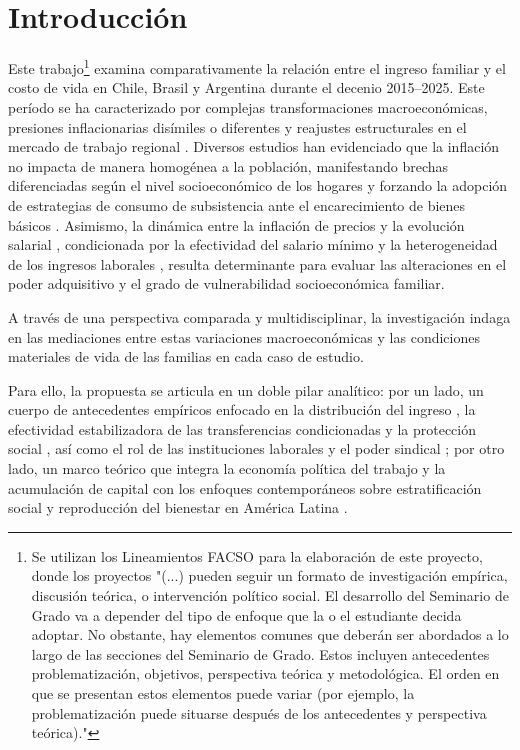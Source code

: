 \section{Introducción}

Este trabajo\footnote[1]{Se utilizan los Lineamientos FACSO para la elaboración de este proyecto, donde los proyectos "(...) pueden seguir un formato de investigación empírica, discusión teórica, o intervención político social. El desarrollo del Seminario de Grado va a depender del tipo de enfoque que la o el estudiante decida adoptar. No obstante, hay elementos comunes que deberán ser abordados a lo largo de las secciones del Seminario de Grado. Estos incluyen antecedentes problematización, objetivos, perspectiva teórica y metodológica. El orden en que se presentan estos elementos puede variar (por ejemplo, la problematización puede situarse después de los antecedentes y perspectiva teórica)."} examina comparativamente la relación entre el ingreso familiar y el costo de vida en Chile, Brasil y Argentina durante el decenio 2015–2025. Este período se ha caracterizado por complejas transformaciones macroeconómicas, presiones inflacionarias disímiles o diferentes y reajustes estructurales en el mercado de trabajo regional \parencite{cepalPanoramaSocialAmerica2025}. Diversos estudios han evidenciado que la inflación no impacta de manera homogénea a la población, manifestando brechas diferenciadas según el nivel socioeconómico de los hogares \parencite{Adam2025, doValleGomesdaSilva2026} y forzando la adopción de estrategias de consumo de subsistencia ante el encarecimiento de bienes básicos \parencite{Nessieretal2026}. Asimismo, la dinámica entre la inflación de precios y la evolución salarial \parencite{Malheretal2026}, condicionada por la efectividad del salario mínimo \parencite{GindlingRonconi2025, MaurizioVazquez2016} y la heterogeneidad de los ingresos laborales \parencite{DuranKremerman2024, INE2024}, resulta determinante para evaluar las alteraciones en el poder adquisitivo y el grado de vulnerabilidad socioeconómica familiar.

A través de una perspectiva comparada y multidisciplinar, la investigación indaga en las mediaciones entre estas variaciones macroeconómicas y las condiciones materiales de vida de las familias en cada caso de estudio. 

Para ello, la propuesta se articula en un doble pilar analítico: por un lado, un cuerpo de antecedentes empíricos enfocado en la distribución del ingreso \parencite{ResumenResultadosCASEN2023}, la efectividad estabilizadora de las transferencias condicionadas y la protección social \parencite{Stampinietal2025, Carrere2026}, así como el rol de las instituciones laborales y el poder sindical \parencite{BarreraInsuaNoguera2026, DuranS2026}; por otro lado, un marco teórico que integra la economía política del trabajo y la acumulación de capital \parencite{DuranSilva2022, MarxElCapital2008} con los enfoques contemporáneos sobre estratificación social y reproducción del bienestar en América Latina \parencite{cepalPanoramaSocialAmerica2025, CostaRibeiroCarcalhaes2024}.
